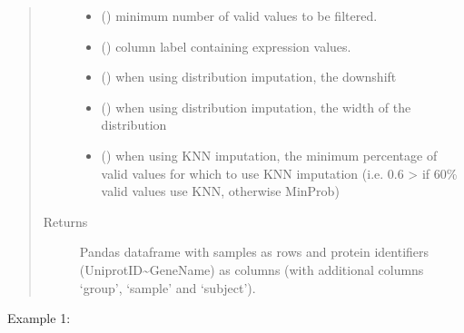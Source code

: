 \documentclass[letterpaper,10pt,english]{sphinxmanual}
\begin{document}
\begin{fulllineitems}
\begin{quote}
\begin{description}
\begin{itemize}
\item {} 
 () \textendash{} minimum number of valid values to be filtered.

\item {} 
 () \textendash{} column label containing expression values.

\item {} 
 () \textendash{} when using distribution imputation, the down\sphinxhyphen{}shift

\item {} 
 () \textendash{} when using distribution imputation, the width of the distribution

\item {} 
 () \textendash{} when using KNN imputation, the minimum percentage of valid values for which to use KNN imputation (i.e. 0.6 \sphinxhyphen{}\textgreater{} if 60\% valid values use KNN, otherwise MinProb)

\end{itemize}

\item[{Returns}] \leavevmode
Pandas dataframe with samples as rows and protein identifiers (UniprotID\textasciitilde{}GeneName) as columns (with additional columns ‘group’, ‘sample’ and ‘subject’).

\end{description}\end{quote}

Example 1:


\end{fulllineitems}
\end{document}
